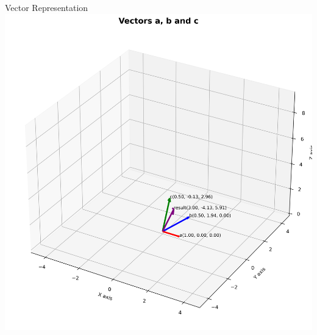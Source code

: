 \documentclass{beamer}
\begin{document}
\begin{frame}{Vector Representation}
   \centering
    \includegraphics[width=\columnwidth, height=0.8\textheight, keepaspectratio]{figs/fig1.png}
    \label{fig:Beamer/figs/fig1.png}
\end{frame}
\end{document}
